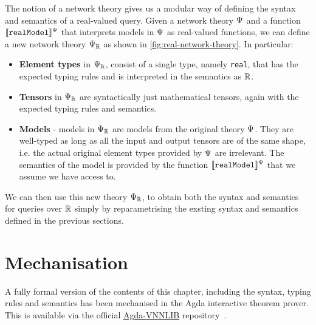 The notion of a network theory gives us a modular way of defining the syntax and semantics of a real-valued query.
Given a network theory $\Psi$ and a function $\llbracket \mathtt{realModel} \rrbracket^\Psi$ that interprets models in $\Psi$ as real-valued functions, we can define a new network theory $\Psi_{\mathbb{R}}$ as shown in \autoref{fig:real-network-theory}. In particular:
\begin{itemize}
\item \textbf{Element types} in $\Psi_{\mathbb{R}}$, consist of a single type, namely \texttt{real}, that has the expected typing rules and is interpreted in the semantics as $\mathbb{R}$.
\item \textbf{Tensors} in $\Psi_{\mathbb{R}}$ are syntactically just mathematical tensors, again with the expected typing rules and semantics.
\item \textbf{Models} - models in $\Psi_{\mathbb{R}}$ are models from the original theory $\Psi$. They are well-typed as long as all the input and output tensors are of the same shape, i.e. the actual original element types provided by $\Psi$ are irrelevant. The semantics of the model is provided by the function $\llbracket \mathtt{realModel} \rrbracket^\Psi$ that we assume we have access to.
\end{itemize}
We can then use this new theory $\Psi_{\mathbb{R}}$, to obtain both the syntax and semantics for queries over $\mathbb{R}$ simply by reparametrising the exsting syntax and semantics defined in the previous sections. 

\section{Mechanisation}

A fully formal version of the contents of this chapter, including the syntax, typing rules and semantics has been mechanised in the Agda interactive theorem prover.
This is available via the official \href{https://github.com/VNNLIB/VNNLIB-Agda}{Agda-VNNLIB} repository~\cite{vnnlib-agda}. 